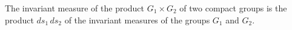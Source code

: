 The invariant measure of the product $G_1 \times G_2$ of two compact groups is the product $ds_1\, ds_2$ of the invariant measures of the groups $G_1$ and $G_2$.
